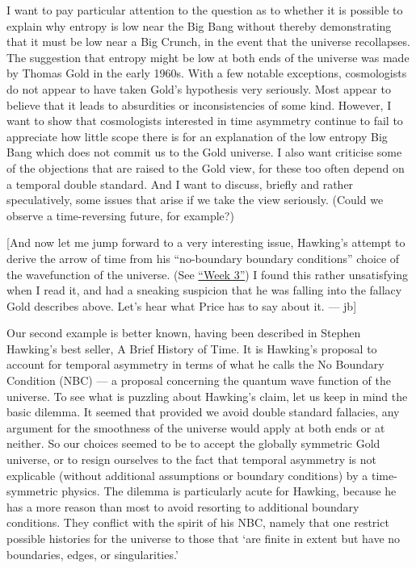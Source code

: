 \documentclass{article}
\begin{document}
I want to pay particular attention to the question as to whether it is
possible to explain why entropy is low near the Big Bang without thereby
demonstrating that it must be low near a Big Crunch, in the event that
the universe recollapses. The suggestion that entropy might be low at
both ends of the universe was made by Thomas Gold in the early 1960s.
With a few notable exceptions, cosmologists do not appear to have taken
Gold's hypothesis very seriously. Most appear to believe that it leads
to absurdities or inconsistencies of some kind. However, I want to show
that cosmologists interested in time asymmetry continue to fail to
appreciate how little scope there is for an explanation of the low
entropy Big Bang which does not commit us to the Gold universe. I also
want criticise some of the objections that are raised to the Gold view,
for these too often depend on a temporal double standard. And I want to
discuss, briefly and rather speculatively, some issues that arise if we
take the view seriously. (Could we observe a time-reversing future, for
example?)

{[}And now let me jump forward to a very interesting issue, Hawking's
attempt to derive the arrow of time from his ``no-boundary boundary
conditions'' choice of the wavefunction of the universe. (See
\protect\hyperlink{week3}{``Week 3''}) I found this rather unsatisfying
when I read it, and had a sneaking suspicion that he was falling into
the fallacy Gold describes above. Let's hear what Price has to say about
it. --- jb{]}

Our second example is better known, having been described in Stephen
Hawking's best seller, A Brief History of Time. It is Hawking's proposal
to account for temporal asymmetry in terms of what he calls the No
Boundary Condition (NBC) --- a proposal concerning the quantum wave
function of the universe. To see what is puzzling about Hawking's claim,
let us keep in mind the basic dilemma. It seemed that provided we avoid
double standard fallacies, any argument for the smoothness of the
universe would apply at both ends or at neither. So our choices seemed
to be to accept the globally symmetric Gold universe, or to resign
ourselves to the fact that temporal asymmetry is not explicable (without
additional assumptions or boundary conditions) by a time-symmetric
physics. The dilemma is particularly acute for Hawking, because he has a
more reason than most to avoid resorting to additional boundary
conditions. They conflict with the spirit of his NBC, namely that one
restrict possible histories for the universe to those that `are finite
in extent but have no boundaries, edges, or singularities.'
\end{document}
